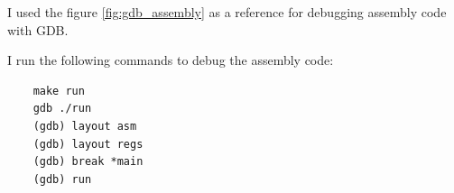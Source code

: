 \documentclass{article}
\begin{document}
I used the figure \ref{fig:gdb_assembly} as a reference for debugging assembly code with GDB.

I run the following commands to debug the assembly code:
\begin{verbatim}
    make run
    gdb ./run
    (gdb) layout asm
    (gdb) layout regs
    (gdb) break *main
    (gdb) run
\end{verbatim}
\end{document}
